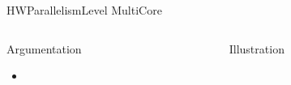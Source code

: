 %
\begin{Frame}{HWParallelismLevel MultiCore}
  \begin{columns}[t]
    \begin{column}{5cm} %
      \begin{block}{Argumentation}
        \begin{itemize}
        \item 
        \end{itemize}
      \end{block} 
    \end{column}
    
    \begin{column}{5cm} %
      \begin{block}{Illustration}
      \end{block}   
    \end{column}
  \end{columns}  
\end{Frame}


